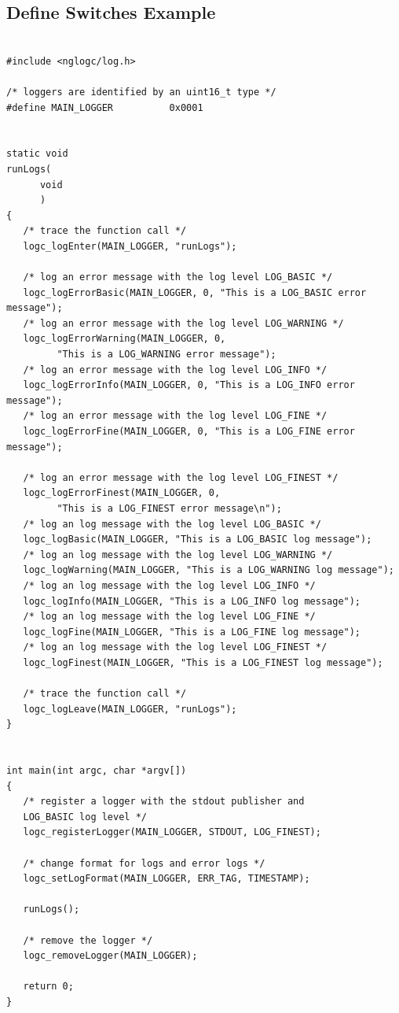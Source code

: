 \documentclass[a4paper, titlepage, 11pt]{article}
\begin{document}
\subsection{Define Switches Example}

\begin{verbatim}

#include <nglogc/log.h>

/* loggers are identified by an uint16_t type */
#define MAIN_LOGGER          0x0001


static void
runLogs(
      void
      )
{
   /* trace the function call */
   logc_logEnter(MAIN_LOGGER, "runLogs");

   /* log an error message with the log level LOG_BASIC */
   logc_logErrorBasic(MAIN_LOGGER, 0, "This is a LOG_BASIC error message");
   /* log an error message with the log level LOG_WARNING */
   logc_logErrorWarning(MAIN_LOGGER, 0,
         "This is a LOG_WARNING error message");
   /* log an error message with the log level LOG_INFO */
   logc_logErrorInfo(MAIN_LOGGER, 0, "This is a LOG_INFO error message");
   /* log an error message with the log level LOG_FINE */
   logc_logErrorFine(MAIN_LOGGER, 0, "This is a LOG_FINE error message");

   /* log an error message with the log level LOG_FINEST */
   logc_logErrorFinest(MAIN_LOGGER, 0,
         "This is a LOG_FINEST error message\n");
   /* log an log message with the log level LOG_BASIC */
   logc_logBasic(MAIN_LOGGER, "This is a LOG_BASIC log message");
   /* log an log message with the log level LOG_WARNING */
   logc_logWarning(MAIN_LOGGER, "This is a LOG_WARNING log message");
   /* log an log message with the log level LOG_INFO */
   logc_logInfo(MAIN_LOGGER, "This is a LOG_INFO log message");
   /* log an log message with the log level LOG_FINE */
   logc_logFine(MAIN_LOGGER, "This is a LOG_FINE log message");
   /* log an log message with the log level LOG_FINEST */
   logc_logFinest(MAIN_LOGGER, "This is a LOG_FINEST log message");

   /* trace the function call */
   logc_logLeave(MAIN_LOGGER, "runLogs");
}


int main(int argc, char *argv[])
{
   /* register a logger with the stdout publisher and
   LOG_BASIC log level */
   logc_registerLogger(MAIN_LOGGER, STDOUT, LOG_FINEST);

   /* change format for logs and error logs */
   logc_setLogFormat(MAIN_LOGGER, ERR_TAG, TIMESTAMP);

   runLogs();

   /* remove the logger */
   logc_removeLogger(MAIN_LOGGER);

   return 0;
}
\end{verbatim}
\end{document}
